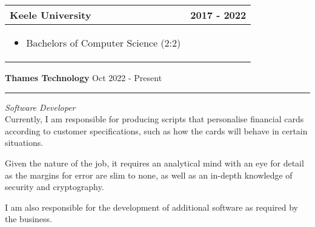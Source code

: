 \documentclass[11pt, twoside, a4paper]{article}
\newlength{\margin}
\newlength{\cvSideWidth}
\begin{document}
\begin{minipage}[t]{\textwidth - \cvSideWidth - 3cm}
\begin{center}
\begin{tabularx}{0.9\textwidth}{ >{\raggedright\arraybackslash}X c}
            \textbf{Keele University} & 2017 - 2022 \\
            \hline
            \begin{itemize}
                \item Bachelors of Computer Science (2:2)
            \end{itemize} \\
        \end{tabularx}
    \end{center}

    { \vspace{0.5cm} \LARGE {} }

    \textbf{Thames Technology} \hfill Oct 2022 - Present
    \hrule 
    \vspace{0.1cm}
    { \color{gray} \textit{Software Developer} } \\
    Currently, I am responsible for producing scripts that personalise 
    financial cards according to customer specifications, such as how
    the cards will behave in certain situations.

    Given the nature of the job, it requires an analytical mind with an eye
    for detail as the margins for error are slim to none, as well as an
    in-depth knowledge of security and cryptography.
        
    I am also responsible for the development of additional software as
    required by the business.


\end{minipage}
\end{document}
